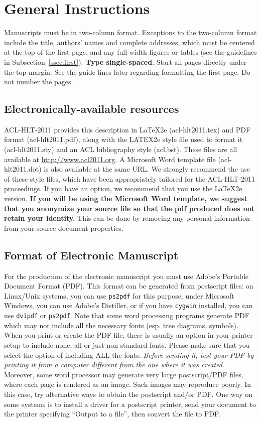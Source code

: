\documentclass[11pt]{article}
\begin{document}
\section{General Instructions}

Manuscripts must be in two-column format. Exceptions to the two-column format include the title, 
authors' names and complete addresses, which must be centered at the top of the first page, 
and any full-width figures or tables (see the guidelines in Subsection~\ref{ssec:first}). {\bf Type single-spaced}. 
Start all pages directly under the top margin. See the guide-lines later regarding formatting the first page. Do not number the pages.

\subsection{Electronically-available resources}

ACL-HLT-2011 provides this description in \LaTeX2e (acl-hlt2011.tex) and PDF format (acl-hlt2011.pdf), along with the LATEX2e style file used to format it (acl-hlt2011.sty) and an ACL bibliography style (acl.bst). These files are all available at \url{http://www.acl2011.org}.  A Microsoft Word template file (acl-hlt2011.dot) is also available at the same URL. We strongly recommend the use of these style files, which have been appropriately tailored for the ACL-HLT-2011 proceedings. If you have an option, we recommend that you use the \LaTeX2e version. \textbf{If you will be using the Microsoft Word template, we suggest that you anonymize your source file so that the pdf produced does not retain your identity.} This can be done by removing any personal information from your source
document properties.


\subsection{Format of Electronic Manuscript}
\label{sect:pdf}

For the production of the electronic manuscript you must use Adobe's
Portable Document Format (PDF). This format can be generated from
postscript files: on Linux/Unix systems, you can use {\tt ps2pdf} for this
purpose; under Microsoft Windows, you can use Adobe's Distiller, or
if you have {\tt cygwin} installed, you can use {\tt dvipdf} or
{\tt ps2pdf}.  Note
that some word processing programs generate PDF which may not include
all the necessary fonts (esp. tree diagrams, symbols). When you print
or create the PDF file, there is usually an option in your printer
setup to include none, all or just non-standard fonts.  Please make
sure that you select the option of including ALL the fonts.  {\em Before sending it, test your PDF by printing it from a computer different from the one where it was created}. Moreover,
some word processor may generate very large postscript/PDF files,
where each page is rendered as an image. Such images may reproduce
poorly.  In this case, try alternative ways to obtain the postscript
and/or PDF.  One way on some systems is to install a driver for a
postscript printer, send your document to the printer specifying
``Output to a file'', then convert the file to PDF.
\end{document}
